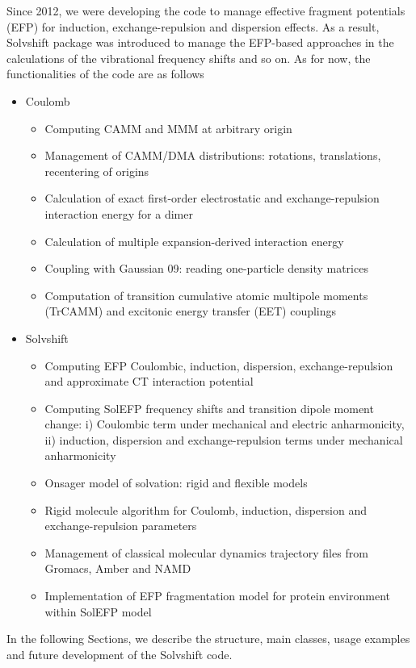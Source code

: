 \documentclass[a4paper,titlepage,twoside,fleqn,12pt]{book}
\begin{document}
\begin{refsection}
Since 2012, we were developing the code to manage effective fragment
potentials (EFP) for induction, exchange\hyp{}repulsion and dispersion
effects. As a result, {\sc Solvshift} package was introduced
to manage the EFP\hyp{}based approaches in the calculations
of the vibrational frequency shifts and so on. As for now, 
the functionalities of the code are as follows
%
\begin{itemize}
 \item {\sc Coulomb}
  \begin{itemize}
  \item Computing CAMM and MMM at arbitrary origin
  \item Management of CAMM/DMA distributions: rotations, translations, recentering of origins
  \item Calculation of exact first\hyp{}order 
        electrostatic and exchange\hyp{}repulsion interaction energy for a dimer
  \item Calculation of multiple expansion\hyp{}derived interaction energy
  \item Coupling with {\sc Gaussian 09}: reading one\hyp{}particle 
                                        density matrices
  \item Computation of transition cumulative atomic multipole moments (TrCAMM)
        and excitonic energy transfer (EET) couplings \citep{Blasiak.Maj.Cho.Gora.JCTC.2015}
  \end{itemize}
 \item {\sc Solvshift}
  \begin{itemize}
  \item Computing EFP Coulombic, induction, dispersion, exchange\hyp{}repulsion and approximate CT
        interaction potential
  \item Computing SolEFP frequency shifts and transition dipole moment change:
        i) Coulombic term under mechanical and electric anharmonicity, 
        ii) induction, dispersion and exchange\hyp{}repulsion terms under mechanical anharmonicity
  \item Onsager model of solvation: rigid and flexible models
  \item Rigid molecule algorithm for Coulomb, induction, dispersion and exchange\hyp{}repulsion
        parameters
  \item Management of classical molecular dynamics trajectory files from Gromacs, Amber and NAMD
  \item Implementation of EFP fragmentation model for protein environment within SolEFP model
  \end{itemize}
\end{itemize}
%
In the following Sections, we describe the structure, main classes,
usage examples and future development of the {\sc Solvshift} code.


\end{refsection}
\end{document}
